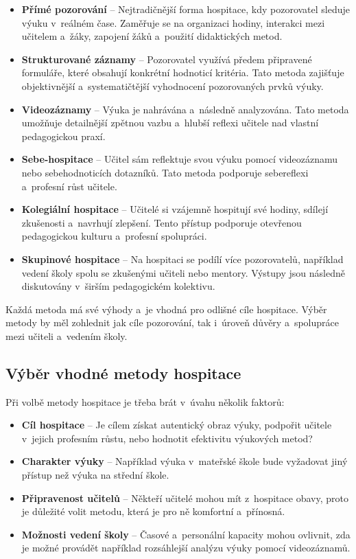 \begin{itemize}
    \item \textbf{Přímé pozorování} – Nejtradičnější forma hospitace, kdy pozorovatel sleduje výuku v~reálném čase. Zaměřuje se na organizaci hodiny, interakci mezi učitelem a~žáky, zapojení žáků a~použití didaktických metod.
    \item \textbf{Strukturované záznamy} – Pozorovatel využívá předem připravené formuláře, které obsahují konkrétní hodnoticí kritéria. Tato metoda zajišťuje objektivnější a~systematičtější vyhodnocení pozorovaných prvků výuky.
    \item \textbf{Videozáznamy} – Výuka je nahrávána a~následně analyzována. Tato metoda umožňuje detailnější zpětnou vazbu a~hlubší reflexi učitele nad vlastní pedagogickou praxí.
    \item \textbf{Sebe-hospitace} – Učitel sám reflektuje svou výuku pomocí videozáznamu nebo sebehodnoticích dotazníků. Tato metoda podporuje sebereflexi a~profesní růst učitele.
    \item \textbf{Kolegiální hospitace} – Učitelé si vzájemně hospitují své hodiny, sdílejí zkušenosti a~navrhují zlepšení. Tento přístup podporuje otevřenou pedagogickou kulturu a~profesní spolupráci.
    \item \textbf{Skupinové hospitace} – Na hospitaci se podílí více pozorovatelů, například vedení školy spolu se zkušenými učiteli nebo mentory. Výstupy jsou následně diskutovány v~širším pedagogickém kolektivu.
\end{itemize}

Každá metoda má své výhody a~je vhodná pro odlišné cíle hospitace. Výběr metody by měl zohlednit jak cíle pozorování, tak i~úroveň důvěry a~spolupráce mezi učiteli a~vedením školy.

\subsection{Výběr vhodné metody hospitace}

Při volbě metody hospitace je třeba brát v~úvahu několik faktorů:

\begin{itemize}
    \item \textbf{Cíl hospitace} – Je cílem získat autentický obraz výuky, podpořit učitele v~jejich profesním růstu, nebo hodnotit efektivitu výukových metod?
    \item \textbf{Charakter výuky} – Například výuka v~mateřské škole bude vyžadovat jiný přístup než výuka na střední škole.
    \item \textbf{Připravenost učitelů} – Někteří učitelé mohou mít z~hospitace obavy, proto je důležité volit metodu, která je pro ně komfortní a~přínosná.
    \item \textbf{Možnosti vedení školy} – Časové a~personální kapacity mohou ovlivnit, zda je možné provádět například rozsáhlejší analýzu výuky pomocí videozáznamů.
\end{itemize}

